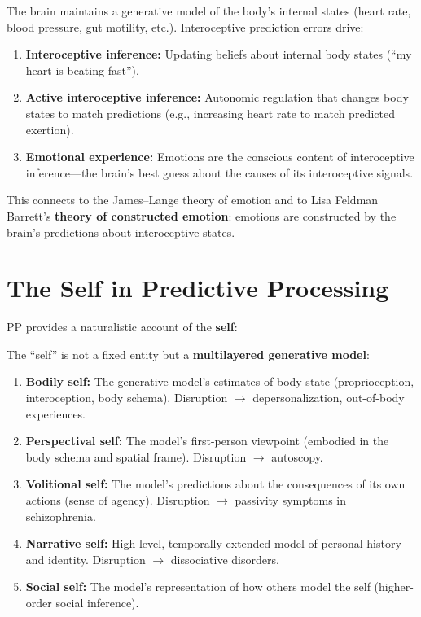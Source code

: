 \documentclass[11pt,a4paper]{report}
\begin{document}
\begin{fepbox}
The brain maintains a generative model of the body's internal states (heart rate, blood pressure, gut motility, etc.). Interoceptive prediction errors drive:
\begin{enumerate}[leftmargin=1.5em]
  \item \textbf{Interoceptive inference:} Updating beliefs about internal body states (``my heart is beating fast'').
  \item \textbf{Active interoceptive inference:} Autonomic regulation that changes body states to match predictions (e.g., increasing heart rate to match predicted exertion).
  \item \textbf{Emotional experience:} Emotions are the conscious content of interoceptive inference---the brain's best guess about the causes of its interoceptive signals.
\end{enumerate}
This connects to the James--Lange theory of emotion and to Lisa Feldman Barrett's \textbf{theory of constructed emotion}: emotions are constructed by the brain's predictions about interoceptive states.
\end{fepbox}

\section{The Self in Predictive Processing}

PP provides a naturalistic account of the \textbf{self}:

\begin{modelbox}
The ``self'' is not a fixed entity but a \textbf{multilayered generative model}:
\begin{enumerate}[leftmargin=1.5em]
  \item \textbf{Bodily self:} The generative model's estimates of body state (proprioception, interoception, body schema). Disruption $\to$ depersonalization, out-of-body experiences.
  \item \textbf{Perspectival self:} The model's first-person viewpoint (embodied in the body schema and spatial frame). Disruption $\to$ autoscopy.
  \item \textbf{Volitional self:} The model's predictions about the consequences of its own actions (sense of agency). Disruption $\to$ passivity symptoms in schizophrenia.
  \item \textbf{Narrative self:} High-level, temporally extended model of personal history and identity. Disruption $\to$ dissociative disorders.
  \item \textbf{Social self:} The model's representation of how others model the self (higher-order social inference).
\end{enumerate}
\end{modelbox}
\end{document}
